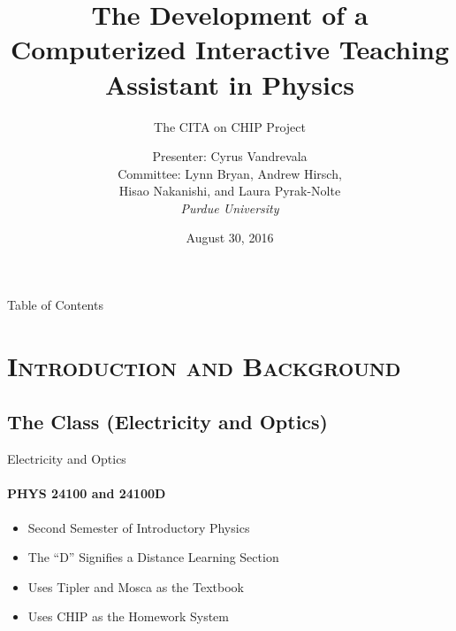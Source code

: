 \documentclass[xcolor=x11names,compress]{beamer}
\begin{document}
\beamertemplatenavigationsymbolsempty

\title{The Development of a Computerized Interactive Teaching Assistant in Physics}
\subtitle{The CITA on CHIP Project}
\author{
    Presenter: Cyrus Vandrevala\\
    \vspace{3mm}
    Committee: Lynn Bryan, Andrew Hirsch,\\
    Hisao Nakanishi, and Laura Pyrak-Nolte\\
    \vspace{3mm}
    {\it Purdue University}\\
}
\date{August 30, 2016}


\begin{frame}
    \titlepage
\end{frame}


\begin{frame}{Table of Contents}
    \tableofcontents
\end{frame}


\section{\scshape Introduction and Background}

\subsection{The Class (Electricity and Optics)}

\begin{frame}{Electricity and Optics}
	\framesubtitle{PHYS 24100 and 24100D}
	\begin{itemize}
		\item Second Semester of Introductory Physics
		\vspace{2mm}
		\item The ``D'' Signifies a Distance Learning Section
		\vspace{2mm}
		\item Uses Tipler and Mosca as the Textbook
		\vspace{2mm}
		\item Uses CHIP as the Homework System
	\end{itemize}
\end{frame}
\end{document}
